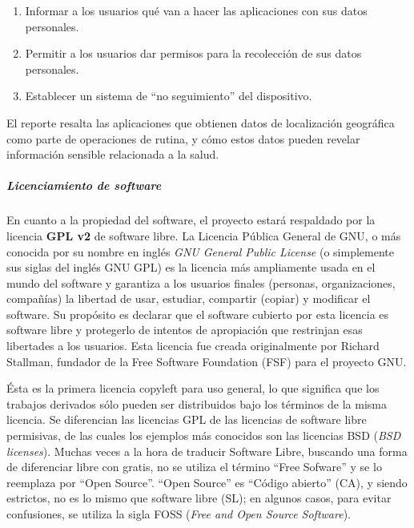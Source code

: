     \begin{enumerate}
		\item Informar a los usuarios qué van a hacer las aplicaciones con sus datos personales.
        \item Permitir a los usuarios dar permisos para la recolección de sus datos personales.
        \item Establecer un sistema de ``no seguimiento'' del dispositivo.
	\end{enumerate}
    
    El reporte resalta las aplicaciones que obtienen datos de localización geográfica como parte de operaciones de rutina, y cómo estos datos pueden revelar información sensible relacionada a la salud.

    
    

\subparagraph{Licenciamiento de software}

    En cuanto a la propiedad del software, el proyecto estará respaldado por la licencia \textbf{GPL v2} de software libre.
    La Licencia Pública General de GNU, o más conocida por su nombre en inglés \textit{GNU General Public License} (o simplemente sus siglas del inglés GNU GPL) es la licencia más ampliamente usada en el mundo del software y garantiza a los usuarios finales (personas, organizaciones, compañías) la libertad de usar, estudiar, compartir (copiar) y modificar el software.
    Su propósito es declarar que el software cubierto por esta licencia es software libre y protegerlo de intentos de apropiación que restrinjan esas libertades a los usuarios.
    Esta licencia fue creada originalmente por Richard Stallman, fundador de la Free Software Foundation (FSF) para el proyecto GNU.
    
    Ésta es la primera licencia copyleft para uso general, lo que significa que los trabajos derivados sólo pueden ser distribuidos bajo los términos de la misma licencia.
     Se diferencian las licencias GPL de las licencias de software libre permisivas, de las cuales los ejemplos más conocidos son las licencias BSD (\textit{BSD licenses}).
     Muchas veces a la hora de traducir Software Libre, buscando una forma de diferenciar libre con gratis, no se utiliza el término ``Free Sofware'' y se lo reemplaza por ``Open Source''.
    ``Open Source'' es ``Código abierto'' (CA), y siendo estrictos, no es lo mismo que software libre (SL); en algunos casos, para evitar confusiones, se utiliza la sigla FOSS (\textit{Free and Open Source Software}).
    
